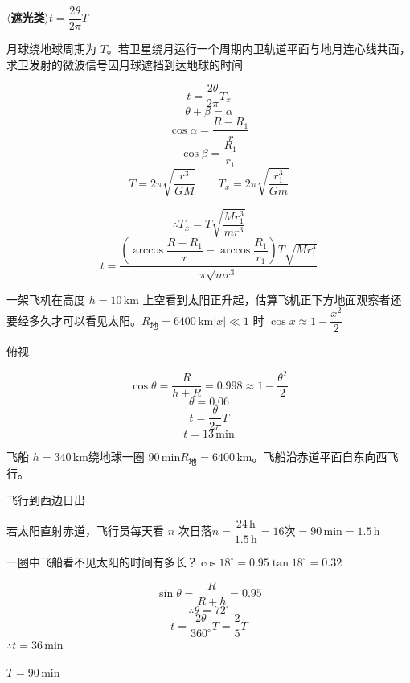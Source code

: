$\langle$\textbf{遮光类}$\rangle$\quad $t=\dfrac{2\theta}{2\pi}T$%
\begin{problem}[1.]
月球绕地球周期为 $T$。若卫星绕月运行一个周期内卫轨道平面与地月连心线共面，求卫发射的微波信号因月球遮挡到达地球的时间%
\begin{solution}
\[ t=\frac{2\theta}{2\pi}T_x \]
\[ \theta+\beta=\alpha \]
\[ \cos\alpha=\frac{R-R_1}{r} \]
\[ \cos\beta=\frac{R_1}{r_1} \]
\[ T=2\pi\sqrt{\frac{r^3}{GM}}\qquad T_x=2\pi\sqrt{\frac{r_1^3}{Gm}} \]
\begin{center}
\end{center}
\[ \therefore T_x=T\sqrt{\frac{Mr_1^3}{mr^3}} \]
\[ t=\frac{\left(\arccos\dfrac{R-R_1}{r}-\arccos\dfrac{R_1}{r_1}\right)T\sqrt{Mr_1^3}}{\pi\sqrt{mr^3}} \]
\end{solution}
\end{problem}
\begin{problem}[2.]
一架飞机在高度 $h=10\,\mathrm{km}$ 上空看到太阳正升起，估算飞机正下方地面观察者还要经多久才可以看见太阳。$R_{\text{地}}=6400\,\mathrm{km}$\quad $|x|\ll1$ 时 $\cos x\approx1-\dfrac{x^2}{2}$
\begin{solution}
俯视

\[ \cos\theta=\frac{R}{h+R}=0.998\approx1-\frac{\theta^2}{2} \]
\[ \theta=0.06 \]
\[ t=\frac{\theta}{2\pi}T \]
\[ t=13\,\mathrm{min} \]
\end{solution}
\end{problem}
\begin{problem}[3.]
飞船 $h=340\,\mathrm{km}$\quad 绕地球一圈 $90\,\mathrm{min}$\quad $R_{\text{地}}=6400\,\mathrm{km}$。飞船沿赤道平面自东向西飞行。

飞行到西边日出

若太阳直射赤道，飞行员每天看 $n$ 次日落\quad $n=\dfrac{24\,\mathrm{h}}{1.5\,\mathrm{h}}=16$次\quad {}$=90\,\mathrm{min}=1.5\,\mathrm{h}$

一圈中飞船看不见太阳的时间有多长？\quad $\cos18^\circ=0.95$\quad $\tan18^\circ=0.32$
\begin{solution}
\[ \sin\theta=\frac{R}{R+h}=0.95 \]
\[ \therefore\theta=72^\circ \]
\[ t=\frac{2\theta}{360^\circ}T=\frac{2}{5}T \]
\quad $\therefore t=36\,\mathrm{min}$%

$T=90\,\mathrm{min}$
\end{solution}
\end{problem}
